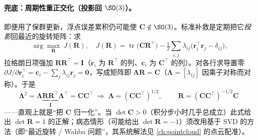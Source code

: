 \paragraph{兜底：周期性重正交化（投影回 $\SO(3)$）。}即便用了保群更新，浮点误差累积仍可能使 $\mathbf{C}\notin\SO(3)$。标准补救是定期把它\emph{投影}回最近的旋转矩阵：求
\begin{equation}
  \arg\max_{\mathbf{R}}\ J(\mathbf{R}),\quad
  J(\mathbf{R})=\operatorname{tr}\big(\mathbf{C}\mathbf{R}^\top\big)-\tfrac12\sum_{i,j}\lambda_{ij}\big(\mathbf{r}_i^\top\mathbf{r}_j-\delta_{ij}\big),
  \label{eq:lk-proj-cost}
\end{equation}
拉格朗日项强加 $\mathbf{R}\mathbf{R}^\top=\mathbf{I}$（$\mathbf{r}_i$ 为 $\mathbf{R}^\top$ 的列、$\mathbf{c}_i$ 为 $\mathbf{C}^\top$ 的列）。对各行求导置零 $\partial J/\partial\mathbf{r}_i^\top=\mathbf{c}_i-\sum_j\lambda_{ij}\mathbf{r}_j=\mathbf{0}$，写成矩阵即 $\boldsymbol{\Lambda}\mathbf{R}=\mathbf{C}$（$\boldsymbol{\Lambda}=[\lambda_{ij}]$ 因乘子对称而对称）。于是
\begin{equation}
  \boldsymbol{\Lambda}^2=\boldsymbol{\Lambda}\underbrace{\mathbf{R}\mathbf{R}^\top}_{\mathbf{I}}\boldsymbol{\Lambda}^\top=\mathbf{C}\mathbf{C}^\top
  \;\Rightarrow\;\boldsymbol{\Lambda}=(\mathbf{C}\mathbf{C}^\top)^{1/2},\qquad
  \boxed{\;\mathbf{R}=(\mathbf{C}\mathbf{C}^\top)^{-1/2}\mathbf{C}\;}
  \label{eq:lk-proj}
\end{equation}
——直观上就是“把 $\mathbf{C}$ 归一化”。当 $\det\mathbf{C}>0$（积分步小时几乎总成立）此式给出 $\det\mathbf{R}=1$ 的正解；病态情形（可能给出 $\det\mathbf{R}=-1$）须改用基于 SVD 的方法（即“最近旋转 / Wahba 问题”，其系统解法见 \cref{ch:pointcloud} 的点云配准）\cite{barfoot2024state}。

